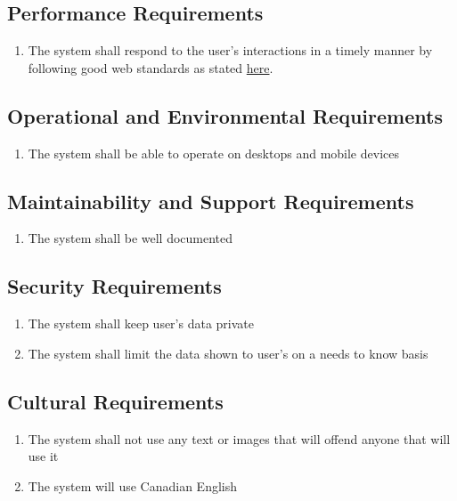 \documentclass[12pt]{article}
\begin{document}
\subsection{Performance Requirements}
\begin{enumerate}[PR\arabic*.]
	\item The system shall respond to the user's interactions in a timely manner by following good web
	      standards as stated \href{https://web.dev/vitals/}{here}.
\end{enumerate}

\subsection{Operational and Environmental Requirements}
\begin{enumerate}[OE\arabic*.]
	\item The system shall be able to operate on desktops and mobile devices
\end{enumerate}

\subsection{Maintainability and Support Requirements}
\begin{enumerate}[MS\arabic*.]
	\item The system shall be well documented
\end{enumerate}

\subsection{Security Requirements}
\begin{enumerate}[SR\arabic*.]
	\item The system shall keep user's data private
	\item The system shall limit the data shown to user's on a needs to know basis
\end{enumerate}

\subsection{Cultural Requirements}
\begin{enumerate}[CR\arabic*.]
	\item The system shall not use any text or images that will offend anyone that will use it
	\item The system will use Canadian English
\end{enumerate}
\end{document}
